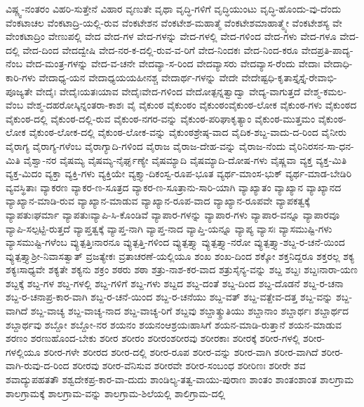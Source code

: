 {ವಿಷ್ಣ್ವ-ನಂತರಂ
ವಿಹರಿ-ಸುತ್ತೇನೆ
ವಿಹಾರ
ವೃಣುತೇ
ವೃಥಾ
ವೃದ್ಧಿ-ಗಳಿಗೆ
ವೃದ್ಧಿಯುಂಟು
ವೃದ್ಧಿ-ಹೊಂದು-ವು-ದೆಂದು
ವೆಂಕಟಾಚಲ
ವೆಂಕಟಾದ್ರಿ-ಯಲ್ಲಿ-ರುವ
ವೆಂಕಟೇಶನ
ವೆಂಕಟೇಶ-ಮಹಾತ್ಮೆ
ವೆಂಕಟೇಶಮಾಹಾತ್ಮ್ಯೇ
ವೆಂಕಟೇಶಸ್ಯ
ವೇ
ವೇಂಕಟಾದ್ರಿಂ
ವೇಣುಪಲ್ಲಿ
ವೇದ
ವೇದ-ಗಳ
ವೇದ-ಗಳನ್ನು
ವೇದ-ಗಳಲ್ಲಿ
ವೇದ-ಗಳಿಂದ
ವೇದ-ಗಳು
ವೇದ-ಗಳೂ
ವೇದ-ದಲ್ಲಿ
ವೇದ-ದಿಂದ
ವೇದದ್ವೇಷಿ
ವೇದ-ನರ-ಕ-ದಲ್ಲಿ-ರುವ-ವ-ರಿಗೆ
ವೇದ-ನಿಂದಕಃ
ವೇದ-ನಿಂದ-ಕರೂ
ವೇದಪ್ರತಿ-ಪಾದ್ಯ-ನೆಂಬ
ವೇದ-ಮಂತ್ರ-ಗಳನ್ನು
ವೇದ-ವ-ಚನೇ
ವೇದವ್ಯಾ-ಸ-ರಿಂದ
ವೇದವ್ಯಾಸರು
ವೇದವ್ಯಾಸ-ರೆಂದು
ವೇದಾಃ
ವೇದಾಧಿ-ಕಾರಿ-ಗಳು
ವೇದಾಧ್ಯ-ಯನ
ವೇದಾಧ್ಯಯಯಹೀನಶ್ಚ
ವೇದಾರ್ಥ-ಗಳನ್ನು
ವೇದೇ
ವೇದೇಷ್ಟಧಿ-ಕೃತಾಸ್ತೈಸ್ತೈ-ರೇವಾಭಿ-ಪೂಜ್ಯತೇ
ವೇದೈಃ
ವೇದೈಃಯತಃಯಾವ
ವೇದೈಃವೇದ-ಗಳಿಂದ
ವೇದೋತ್ಪನ್ನತ್ವಾದ್ವಾ
ವೇದ್ಯ-ವಾಗುತ್ತದೆ
ವೇಶ್ಮ-ಕಮಲ-ವೆಂಬ
ವೇಶ್ಮ-ದಹರೋಸ್ಕಿನ್ನಂತರಾ-ಕಾಶಃ
ವೈ
ವೈಕುಂಠ
ವೈಕುಂಠಂ
ವೈಕುಂಠಂವೈಕುಂಠ-ಲೋಕ
ವೈಕುಂಠ-ಗಳು
ವೈಕುಂಠದ
ವೈಕುಂಠ-ದಲ್ಲಿ
ವೈಕುಂಠ-ದಲ್ಲಿ-ರುವ
ವೈಕುಂಠ-ನಗರ-ವನ್ನು
ವೈಕುಂಠ-ಪರಿಘಾಕೃತ್ಯಾಂ
ವೈಕುಂಠ-ಮುತ್ತಮಂ
ವೈಕುಂಠ-ಲೋಕ
ವೈಕುಂಠ-ಲೋಕ-ದಲ್ಲಿ
ವೈಕುಂಠ-ಲೋಕ-ವನ್ನು
ವೈಕುಂಠಶ್ರೇಷ್ಠ-ವಾದ
ವೈದಿಕ-ಶಬ್ದ-ವಾದು-ದ-ರಿಂದ
ವೈನೀರು
ವೈರಾಗ್ಯ
ವೈರಾಗ್ಯ-ಗಳೆಂಬ
ವೈರಾಗ್ಯಾದಿ-ಗಳಿಂದ
ವೈರಾಜ
ವೈರಾಜ-ದೇಹ-ವನ್ನು
ವೈರಾಜ-ನೆಂದು
ವೈರಿನಿರಸನ-ಸಾ-ಧನ-ಮಿತಿ
ವೈಶ್ವಾ-ನರ
ವೈಷಮ್ಯ
ವೈಷಮ್ಯ-ನೈರ್ಘೃಣ್ಯೇ
ವೈಷಮ್ಯಾದಿ
ವೈಷಮ್ಯಾದಿ-ದೋಷ-ಗಳು
ವೈಷ್ಣವಾ
ವ್ಯಕ್ತ
ವ್ಯಕ್ತ-ಮಿತಿ
ವ್ಯಕ್ತ-ಮಿದಂ
ವ್ಯಕ್ತಾ
ವ್ಯಕ್ತಿ-ಗಳು
ವ್ಯಕ್ತಿಯೇ
ವ್ಯಕ್ತ್ಯಾ-ದಿಕಂಸ್ವ-ರೂಪ-ಭೂತ
ವ್ಯರ್ಥ-ಮಾಂಸ-ಭುಕ್
ವ್ಯರ್ಥ-ಮಾಡ-ಬೇಡಿರಿ
ವ್ಯವಸ್ಥಿತಾಃ
ವ್ಯಾಕರಣ
ವ್ಯಾಕರ-ಣ-ಸೂತ್ರದ
ವ್ಯಾಕರ-ಣ-ಸೂತ್ರಾನು-ಸಾರಿ-ಯಾಗಿ
ವ್ಯಾಖ್ಯಾತಂ
ವ್ಯಾಖ್ಯಾನ
ವ್ಯಾಖ್ಯಾನದ
ವ್ಯಾಖ್ಯಾನ-ಮಾಡಿ-ರುವ
ವ್ಯಾಖ್ಯಾನ-ಮಾಡುವ
ವ್ಯಾಖ್ಯಾನ-ರೂಪ-ವಾದ
ವ್ಯಾಖ್ಯಾನ-ರೂಪವೇ
ವ್ಯಾಪಕತ್ವಕ್ಕೆ
ವ್ಯಾಪತುಃಘರ್ಮಾ
ವ್ಯಾಪತುಃವ್ಯಾಪಿ-ಸಿ-ಕೊಂಡಿವೆ
ವ್ಯಾಪಾರ-ಗಳನ್ನು
ವ್ಯಾಪಾರ-ಗಳು
ವ್ಯಾಪಾರ-ವನ್ನೂ
ವ್ಯಾಪಾರವೂ
ವ್ಯಾಪಿ-ಸಲ್ಪಟ್ಟಿ-ರುತ್ತದೆ
ವ್ಯಾಪ್ತತ್ವಕ್ಕೆ
ವ್ಯಾಪ್ತ-ನಾಗಿ
ವ್ಯಾಪ್ತ-ನಾದ
ವ್ಯಾಪ್ತಿ-ಯನ್ನೂ
ವ್ಯಾಪ್ಯ
ವ್ಯಾಸಃ
ವ್ಯಾಸಮುಷ್ಟಿ-ಗಳು
ವ್ಯಾಸಮುಷ್ಟಿ-ಗಳೆಂಬ
ವ್ಯುತ್ಪತ್ತಿಃನಾರನೂ
ವ್ಯುತ್ಪತ್ತಿ-ಗಳಿಂದ
ವ್ಯುತ್ಪತ್ತ್ಯಾ
ವ್ಯುತ್ಪತ್ತ್ಯಾ-ನರೋ
ವ್ಯುತ್ಪತ್ತ್ಯಾ-ಶಬ್ದ-ರ-ಚನೆ-ಯಿಂದ
ವ್ಯುತ್ಪತ್ತ್ಯಾಶ್ರೀ-ನಿವಾಸತ್ವಾತ್
ವ್ರಜತ್ಯೇಕಃ
ವ್ರತಾಚರಣೆ-ಯಲ್ಲಿಯೂ
ಶಂಖ
ಶಂಖ-ದಿಂದ
ಶಕ್ಕೋ
ಶಕ್ತನಿದ್ದರೂ
ಶಕ್ತರಲ್ಲ
ಶಕ್ಯ
ಶಕ್ಯಃಸಾಧ್ಯವೇ
ಶಕ್ಯತೇ
ಶಕ್ಯನು
ಶಕ್ರಂ
ಶಠರು
ಶಠಾ
ಶತ್ರು-ನಾಶ-ಕರ-ವಾದ
ಶತ್ರುಸೈನ್ಯ-ವನ್ನು
ಶಬ್ದ
ಶಬ್ದಃ
ಶಬ್ದಃನಾರಾ-ಯಣ
ಶಬ್ದಕ್ಕೆ
ಶಬ್ದ-ಗಳ
ಶಬ್ದ-ಗಳಲ್ಲಿ
ಶಬ್ದ-ಗಳಿಗೆ
ಶಬ್ದ-ಗಳು
ಶಬ್ದದ
ಶಬ್ದ-ದಂತೆ
ಶಬ್ದ-ದಿಂದ
ಶಬ್ದ-ದೊಡನೆ
ಶಬ್ದ-ರ-ಚನಾ
ಶಬ್ದ-ರ-ಚನಾಪ್ರ-ಕಾರ-ವಾಗಿ
ಶಬ್ದ-ರ-ಚನೆ-ಯಿಂದ
ಶಬ್ದ-ರ-ಚನೆಯು
ಶಬ್ದ-ವತ್
ಶಬ್ದ-ವತ್ದೇವ-ದತ್ತ
ಶಬ್ದ-ವನ್ನು
ಶಬ್ದ-ವಾಗಿದೆ
ಶಬ್ದ-ವಾಚ್ಯ
ಶಬ್ದ-ವಾಚ್ಯ-ನಾದ
ಶಬ್ದ-ವಾಚ್ಯ-ರಿಗೆ
ಶಬ್ದವು
ಶಬ್ದಾತ್ಶ್ರುತಿಯು
ಶಬ್ದಾನಾಂ
ಶಬ್ದಾರ್ಥಃ
ಶಬ್ದಾರ್ಥದ
ಶಬ್ದಾರ್ಥವು
ಶಬ್ದೋ
ಶಬ್ದೋ-ನರ
ಶಯನಂ
ಶಯನಂಆಶ್ರಯಃಹಾಸಿಗೆ
ಶಯನ-ಮಾಡಿ-ರುತ್ತಾನೆ
ಶಯನ-ಮಾಡುವ
ಶರಣಂ
ಶರಣುಹೊಂದ-ಬೇಕು
ಶರೀರ
ಶರೀರಂ
ಶರೀರಂಶರೀರವು
ಶರೀರಕಾಃ
ಶರೀರಕ್ಕೆ
ಶರೀರ-ಗಳಲ್ಲಿ
ಶರೀರ-ಗಳಲ್ಲಿಯೂ
ಶರೀರ-ಗಳೇ
ಶರೀರದ
ಶರೀರ-ದಲ್ಲಿ
ಶರೀರ-ರೂಪ
ಶರೀರ-ವನ್ನು
ಶರೀರ-ವಾಗಿ
ಶರೀರ-ವಾಗಿದೆ
ಶರೀರ-ವಾಗಿ-ರುವು-ದ-ರಿಂದ
ಶರೀರವು
ಶರೀರ-ವೆನಿಸುವ
ಶರೀರವೇ
ಶರೀರ-ಸಂಬಂಧ
ಶರೀರಿಣಃ
ಶರೀರೇ
ಶವ
ಶವಾದ್ಯುಪಹತತೌ
ಶಶ್ವದೇಕಪ್ರ-ಕಾರ-ವಾ-ದುದು
ಶಾಂಡಿಲ್ಯ-ತತ್ವ-ವಾಯು-ಪುರಾಣ
ಶಾಂತಂ
ಶಾಂತಂಶಾಂತ
ಶಾಲಗ್ರಾಮ
ಶಾಲಗ್ರಾಮಕ್ಕೆ
ಶಾಲಗ್ರಾಮ-ವನ್ನು
ಶಾಲಗ್ರಾಮ-ಶಿಲೆಯಲ್ಲಿ
ಶಾಲಿಗ್ರಾಮ-ದಲ್ಲಿ
}

